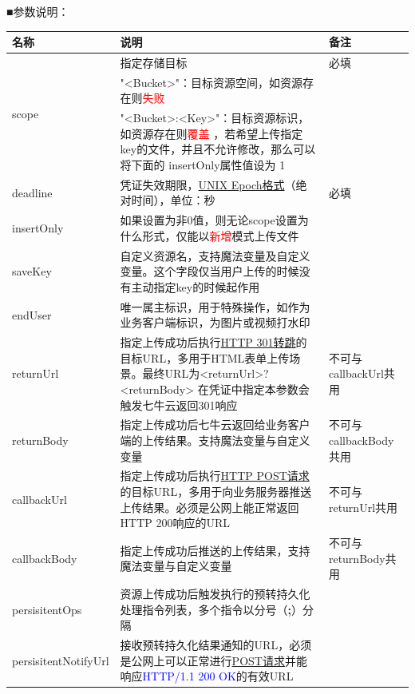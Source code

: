 \documentclass[11pt, oneside]{book}
\newcommand{\qblock}[1]{
\vspace{0.1em}
\noindent
#1\par
\vspace{0.1em}
}
\newcommand{\qtable}[1]{\footnotesize\vspace{0.5em}#1\vspace{0.5em}\normalsize}
\begin{document}
\qblock{■\thinspace 参数说明：}
\begin{center}
\qtable{
\def\arraystretch{2}
\setlength{\extrarowheight}{1.6pt}
\begin{longtable}{|m{12em}<{\centering}|p{25em}|p{8em}|}
\hline
名称 & 说明 & 备注 \\
\hline
\endhead
\multirow{3}{*}{scope} & 指定存储目标 & 必填 \\
      & "<Bucket>"：目标资源空间，如资源存在则\textcolor{red}{失败} & \\
      & "<Bucket>:<Key>"：目标资源标识，如资源存在则\textcolor{red}{覆盖} ，若希望上传指定key的文件，并且不允许修改，那么可以将下面的 insertOnly属性值设为 1& \\
\hline
deadline & 凭证失效期限，\href{http://en.wikipedia.org/wiki/Unix_time}{UNIX Epoch格式}（绝对时间），单位：秒 & 必填 \\
\hline
insertOnly & 如果设置为非0值，则无论scope设置为什么形式，仅能以\textcolor{red}{新增}模式上传文件&\\
\hline
saveKey & 自定义资源名，支持魔法变量及自定义变量。这个字段仅当用户上传的时候没有主动指定key的时候起作用 & \\
\hline
endUser & 唯一属主标识，用于特殊操作，如作为业务客户端标识，为图片或视频打水印 & \\
\hline
returnUrl & 指定上传成功后执行\href{http://en.wikipedia.org/wiki/HTTP_301}{HTTP 301转跳}的目标URL，多用于HTML表单上传场景。最终URL为<returnUrl>?<returnBody> \newline 在凭证中指定本参数会触发七牛云返回301响应 & 不可与callbackUrl共用 \\
\hline
returnBody & 指定上传成功后七牛云返回给业务客户端的上传结果。支持魔法变量与自定义变量 & 不可与callbackBody共用 \\
\hline
callbackUrl & 指定上传成功后执行\href{http://en.wikipedia.org/wiki/POST_(HTTP)}{HTTP POST请求}的目标URL，多用于向业务服务器推送上传结果。必须是公网上能正常返回HTTP 200响应的URL & 不可与returnUrl共用 \\
\hline
callbackBody & 指定上传成功后推送的上传结果，支持魔法变量与自定义变量 & 不可与returnBody共用 \\
\hline
persisitentOps & 资源上传成功后触发执行的预转持久化处理指令列表，多个指令以分号（{\bf ;}）分隔 & \\
\hline
persisitentNotifyUrl & 接收预转持久化结果通知的URL，必须是公网上可以正常进行\href{http://en.wikipedia.org/wiki/POST_(HTTP)}{POST请求}并能响应\textcolor{blue}{HTTP/1.1 200 OK}的有效URL & \\
\hline

\end{longtable}}
\end{center}
\end{document}
